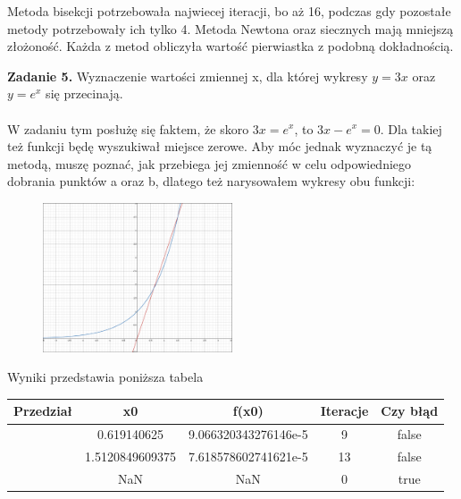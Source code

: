 \documentclass[15pt, a4paper]{article}
\begin{document}
\noindent Metoda bisekcji potrzebowała najwiecej iteracji, bo aż 16, podczas gdy pozostałe metody potrzebowały ich tylko 4. Metoda Newtona oraz siecznych mają mniejszą złożoność. Każda z metod obliczyła wartość pierwiastka z podobną dokładnością.

\vspace{0.5cm}

\noindent\hrulefill

\vspace{0.5cm}


\noindent\textbf{Zadanie 5.} Wyznaczenie wartości zmiennej x, dla której wykresy \( y = 3x \) oraz \( y = e^x \) się przecinają.\\\\
\noindent W zadaniu tym posłużę się faktem, że skoro \(3x = e^x \), to \(3x - e^x = 0 \). Dla takiej też funkcji będę wyszukiwał miejsce zerowe. Aby móc jednak wyznaczyć je tą metodą, muszę poznać, jak przebiega jej zmienność w celu odpowiedniego dobrania punktów a oraz b, dlatego też narysowałem wykresy obu funkcji:\\

\begin{figure}[h]
    \centering
    \includegraphics[width=0.5\textwidth]{img/wykreszad5.png}
\end{figure}

\noindent Wyniki przedstawia poniższa tabela

\begin{table}[ht]
\begin{adjustbox}{max width=\textwidth}
\begin{tabular}{|c|c|c|c|c|}
    \hline
    \textbf{Przedział} & \textbf{x0} & \textbf{f(x0)} & \textbf{Iteracje} & \textbf{Czy błąd} \\
    \hline
    [0.0, 1.0] & 0.619140625 & 9.066320343276146e-5 & 9 & false \\
    \hline
    [1.0, 2.0] & 1.5120849609375 & 7.618578602741621e-5 & 13 & false \\
    \hline
    [0.0, 2.0] & NaN & NaN & 0 & true \\
    \hline
\end{tabular}
\end{adjustbox}
\end{table}
\end{document}
